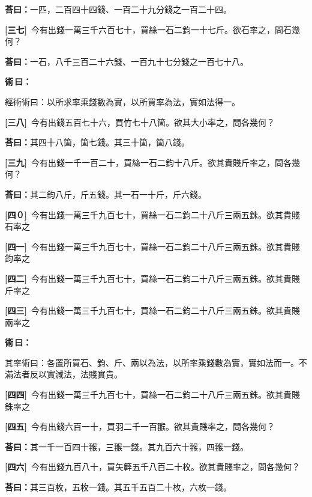 \documentclass[11pt,a4paper]{article}
\newenvironment{method}{%
  \par\noindent\textcolor{methodcolor}{\textbf{術\,曰：}}%
  \ignorespaces
}{\par\vspace{0.5em}}
\newcommand{\problemnum}[1]{\textbf{[\ignorespaces#1\unskip]}}
\begin{document}
\noindent\textcolor{answercolor}{\textbf{荅曰：}}一匹，二百四十四錢、一百二十九分錢之一百二十四。

\noindent\problemnum{三七}\,
今有出錢一萬三千六百七十，買絲一石二鈞一十七斤。欲石率之，問石幾何？

\noindent\textcolor{answercolor}{\textbf{荅曰：}}一石，八千三百二十六錢、一百九十七分錢之一百七十八。

\begin{method}
經術術曰：以所求率乘錢數為實，以所買率為法，實如法得一。
\end{method}

\noindent\problemnum{三八}\,
今有出錢五百七十六，買竹七十八箇。欲其大小率之，問各幾何？

\noindent\textcolor{answercolor}{\textbf{荅曰：}}其四十八箇，箇七錢。其三十箇，箇八錢。

\noindent\problemnum{三九}\,
今有出錢一千一百二十，買絲一石二鈞十八斤。欲其貴賤斤率之，問各幾何？

\noindent\textcolor{answercolor}{\textbf{荅曰：}}其二鈞八斤，斤五錢。其一石一十斤，斤六錢。

\noindent\problemnum{四０}\,
今有出錢一萬三千九百七十，買絲一石二鈞二十八斤三兩五銖。欲其貴賤石率之

\noindent\problemnum{四一}\,
今有出錢一萬三千九百七十，買絲一石二鈞二十八斤三兩五銖。欲其貴賤鈞率之

\noindent\problemnum{四二}\,
今有出錢一萬三千九百七十，買絲一石二鈞二十八斤三兩五銖。欲其貴賤斤率之

\noindent\problemnum{四三}\,
今有出錢一萬三千九百七十，買絲一石二鈞二十八斤三兩五銖。欲其貴賤兩率之

\begin{method}
其率術曰：各置所買石、鈞、斤、兩以為法，以所率乘錢數為實，實如法而一。不滿法者反以實減法，法賤實貴。
\end{method}

\noindent\problemnum{四四}\,
今有出錢一萬三千九百七十，買絲一石二鈞二十八斤三兩五銖。欲其貴賤銖率之

\noindent\problemnum{四五}\,
今有出錢六百一十，買羽二千一百翭。欲其貴賤率之，問各幾何？

\noindent\textcolor{answercolor}{\textbf{荅曰：}}其一千一百四十翭，三翭一錢。其九百六十翭，四翭一錢。

\noindent\problemnum{四六}\,
今有出錢九百八十，買矢簳五千八百二十枚。欲其貴賤率之，問各幾何？

\noindent\textcolor{answercolor}{\textbf{荅曰：}}其三百枚，五枚一錢。其五千五百二十枚，六枚一錢。
\end{document}

